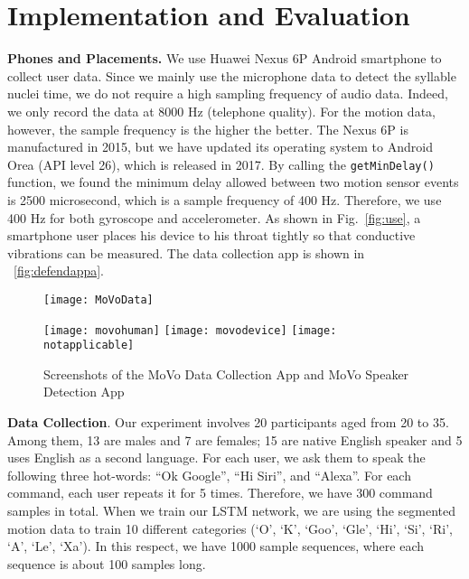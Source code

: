 \section{Implementation and Evaluation}


\textbf{Phones and Placements.} We use Huawei Nexus 6P Android smartphone to collect user data. Since we mainly use the microphone data to detect the syllable nuclei time, we do not require a high sampling frequency of audio data. Indeed, we only record the data at 8000 Hz (telephone quality). For the motion data, however, the sample frequency is the higher the better. The Nexus 6P is manufactured in 2015, but we have updated its operating system to Android Orea (API level 26), which is released in 2017. By calling the \texttt{getMinDelay()} function, we found the minimum delay allowed between two motion sensor events is 2500 microsecond, which is a sample frequency of 400 Hz. Therefore, we use 400 Hz for both gyroscope and accelerometer. As shown in Fig.~\ref{fig:use}, a smartphone user places his device to his throat tightly so that conductive vibrations can be measured. The data collection app is shown in ~\ref{fig:defendappa}.

\begin{figure}[H]
	\centering
	\begin{minipage}{.3\linewidth}
		\texttt{[image: MoVoData]}
		\label{fig:defendappa}
	\end{minipage}
	\qquad 
	\begin{minipage}{.6\linewidth}
		\texttt{[image: movohuman]}
		\vspace{.1in}
		\texttt{[image: movodevice]}
		\vspace{.1in}
		\texttt{[image: notapplicable]}
	\end{minipage}
	\caption{Screenshots of the MoVo Data Collection App and MoVo Speaker Detection App}	
	\label{fig:defendapp}
\end{figure}

\textbf{Data Collection}. Our experiment involves 20 participants aged from 20 to 35. Among them, 13 are males and 7 are females; 15 are native English speaker and 5 uses English as a second language. For each user, we ask them to speak the following three hot-words: ``Ok Google'', ``Hi Siri'', and ``Alexa''. For each command, each user repeats it for 5 times. Therefore, we have 300 command samples in total. When we train our LSTM network, we are using the segmented motion data to train 10 different categories (`O', `K', `Goo', `Gle', `Hi', `Si', `Ri', `A', `Le', `Xa'). In this respect, we have 1000 sample sequences, where each sequence is about 100 samples long.


